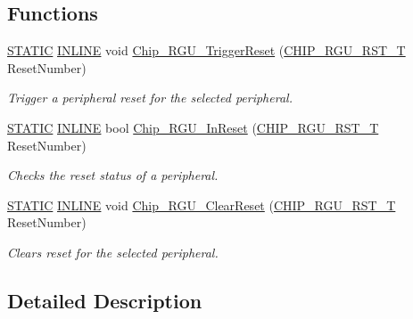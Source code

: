 \subsection*{Functions}
\begin{DoxyCompactItemize}
\item 
\hyperlink{group___l_p_c___types___public___macros_ga10b2d890d871e1489bb02b7e70d9bdfb}{S\+T\+A\+T\+IC} \hyperlink{spifi__18xx__43xx_8h_a2eb6f9e0395b47b8d5e3eeae4fe0c116}{I\+N\+L\+I\+NE} void \hyperlink{group___r_g_u__18_x_x__43_x_x_ga3cc30f9a3adbdba9866e6a80cb9eb71d}{Chip\+\_\+\+R\+G\+U\+\_\+\+Trigger\+Reset} (\hyperlink{group___r_g_u__18_x_x__43_x_x_gaf76b0dbb78e73bbcd44948364417ae60}{C\+H\+I\+P\+\_\+\+R\+G\+U\+\_\+\+R\+S\+T\+\_\+T} Reset\+Number)
\begin{DoxyCompactList}\small\item\em Trigger a peripheral reset for the selected peripheral. \end{DoxyCompactList}\item 
\hyperlink{group___l_p_c___types___public___macros_ga10b2d890d871e1489bb02b7e70d9bdfb}{S\+T\+A\+T\+IC} \hyperlink{spifi__18xx__43xx_8h_a2eb6f9e0395b47b8d5e3eeae4fe0c116}{I\+N\+L\+I\+NE} bool \hyperlink{group___r_g_u__18_x_x__43_x_x_gabada148b5dec002cb3e8a748e6613194}{Chip\+\_\+\+R\+G\+U\+\_\+\+In\+Reset} (\hyperlink{group___r_g_u__18_x_x__43_x_x_gaf76b0dbb78e73bbcd44948364417ae60}{C\+H\+I\+P\+\_\+\+R\+G\+U\+\_\+\+R\+S\+T\+\_\+T} Reset\+Number)
\begin{DoxyCompactList}\small\item\em Checks the reset status of a peripheral. \end{DoxyCompactList}\item 
\hyperlink{group___l_p_c___types___public___macros_ga10b2d890d871e1489bb02b7e70d9bdfb}{S\+T\+A\+T\+IC} \hyperlink{spifi__18xx__43xx_8h_a2eb6f9e0395b47b8d5e3eeae4fe0c116}{I\+N\+L\+I\+NE} void \hyperlink{group___r_g_u__18_x_x__43_x_x_gaae3ec369bc443e52bd8d76d759d79d9c}{Chip\+\_\+\+R\+G\+U\+\_\+\+Clear\+Reset} (\hyperlink{group___r_g_u__18_x_x__43_x_x_gaf76b0dbb78e73bbcd44948364417ae60}{C\+H\+I\+P\+\_\+\+R\+G\+U\+\_\+\+R\+S\+T\+\_\+T} Reset\+Number)
\begin{DoxyCompactList}\small\item\em Clears reset for the selected peripheral. \end{DoxyCompactList}\end{DoxyCompactItemize}


\subsection{Detailed Description}


